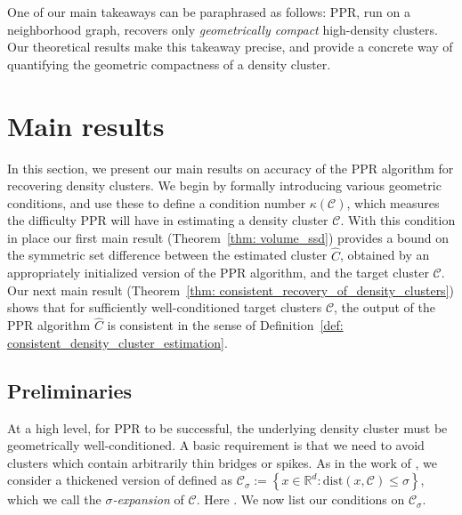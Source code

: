 \documentclass[11pt,twoside]{article}
\theoremstyle{definition}
\newcommand{\set}[1]{\left\{#1\right\}}
\newcommand{\Reals}{\mathbb{R}}
\newcommand{\norm}[1]{\left\lVert#1\right\rVert}
\newcommand{\1}{\mathbbm{1}}
\newcommand{\dist}{\mathrm{dist}}
\newcommand{\Cbb}{\mathbb{C}}
\newcommand{\Cset}{\mathcal{C}}
\newcommand{\Csig}{\Cset_{\sigma}}
\newcommand{\Cest}{\widehat{C}}
\begin{document}
One of our main takeaways can be paraphrased as follows: PPR, run on a
neighborhood graph, recovers only \emph{geometrically compact} high-density
clusters. Our theoretical results make this takeaway precise, and provide a 
concrete way of quantifying the geometric compactness of a density 
cluster.  

\section{Main results}
\label{sec: consistent_cluster_estimation_with_ppr}

In this section, we present our main results on accuracy of the PPR algorithm
for recovering density clusters.  We begin by formally introducing various
geometric conditions, and use these to define a condition number
$\kappa(\Cset)$, which measures the difficulty PPR will have in estimating a
density cluster $\Cset$. With this condition in place our first main result
(Theorem~\ref{thm: volume_ssd}) provides a bound on the symmetric set difference
between the estimated cluster $\Cest$, obtained by an appropriately initialized 
version of the PPR algorithm, and the target cluster $\Cset$.  Our next main
result (Theorem~\ref{thm: consistent_recovery_of_density_clusters}) shows that
for sufficiently well-conditioned target clusters $\Cset$, the output of the PPR
algorithm $\Cest$ is consistent in the sense of Definition~\ref{def:
consistent_density_cluster_estimation}.

\subsection{Preliminaries}

At a high level, for PPR to be successful, the underlying density cluster must
be geometrically well-conditioned.  A basic requirement is that we need to avoid
clusters which contain arbitrarily thin bridges or spikes. As in the work of
\citet{chaudhuri2010}, we consider a thickened version of \smash{$\Cset \in
\Cbb_f(\lambda)$} defined as $\Csig := \set{x \in \Reals^d: \dist(x,\Cset) \leq
\sigma}$, which we call the \emph{$\sigma$-expansion} of $\Cset$. Here
\smash{$\dist(x,\Cset) := \inf_{y \in \Cset} \norm{y - x}$}.  We now list our
conditions on $\Csig$.
\end{document}
